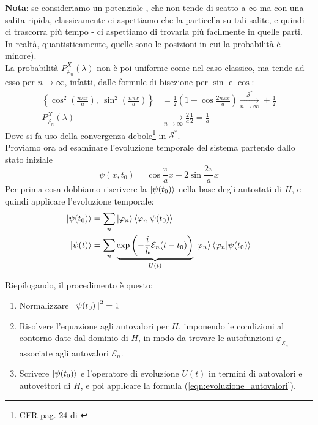 \documentclass[../../FisicaTeorica.tex]{subfiles}
\begin{document}
\textbf{Nota}: se consideriamo un potenziale , che non tende di scatto a $\infty$ ma  con una salita ripida, classicamente ci aspettiamo che la particella  su tali salite, e quindi ci trascorra più tempo - ci aspettiamo di trovarla più facilmente in quelle parti. In realtà, quantisticamente, quelle sono le posizioni in cui la probabilità è minore).\\

La probabilità $P^X_{\varphi_n}(\lambda)$ non è poi uniforme come nel caso classico, ma tende ad esso per $n\to\infty$, infatti, dalle formule di bisezione per $\sin$ e $\cos$:
\begin{align*}
\left\{\cos^2 \left(\frac{n\pi x}{a}\right),\>
\sin^2 \left(\frac{n\pi x}{a}\right)\right\} &= \frac{1}{2}\left(1\pm \cos \frac{2n\pi x}{a} \right)\xrightarrow[n\to\infty]{\mathcal{S}^*} +\frac{1}{2}\\
P_{\varphi_n}^X(\lambda) &\xrightarrow[n\to\infty]{} \frac{2}{a}\frac{1}{2} = \frac{1}{a}
\end{align*}
Dove si fa uso della convergenza debole\footnote{CFR pag. 24 di \cite{spazi_hilbert}} in $\mathcal{S}^*$.\\

Proviamo ora ad esaminare l'evoluzione temporale del sistema partendo dallo stato iniziale 
\begin{equation}
\psi(x,t_0) = \cos\frac{\pi}{a} x+2\sin\frac{2\pi}{a}x
\label{eqn:stato_iniziale}
\end{equation}
Per prima cosa dobbiamo riscrivere la $\ket{\psi(t_0)}$ nella base degli autostati di $H$, e quindi applicare l'evoluzione temporale:
\begin{align}
\ket{\psi(t_0)} &= \sum_n \ket{\varphi_n}\braket{\varphi_n|\psi(t_0)}\nonumber \\
\label{eqn:evoluzione_autovalori}
\ket{\psi(t)} &= \sum_n \underbrace{\exp\left(-\frac{i}{\hbar}\mathcal{E}_n(t-t_0)\right)}_{U(t)}\ket{\varphi_n}\braket{\varphi_n|\psi(t_0)}
\end{align}

Riepilogando, il procedimento è questo:
\begin{enumerate}
\item Normalizzare $\left\lVert\psi(t_0)\right\rVert^2 = 1$\\
\item Risolvere l'equazione agli autovalori per $H$, imponendo le condizioni al contorno date dal dominio di $H$, in modo da trovare le autofunzioni $\varphi_{\mathcal{E}_n}$ associate agli autovalori $\mathcal{E}_n$.
\item Scrivere $\ket{\psi(t_0)}$ e l'operatore di evoluzione $U(t)$ in termini di autovalori e autovettori di $H$, e poi applicare la formula (\ref{eqn:evoluzione_autovalori}).
\end{enumerate}
\end{document}
